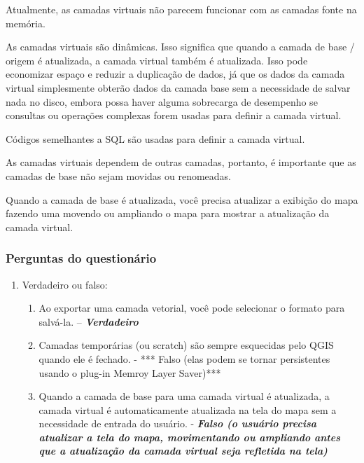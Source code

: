 \documentclass[
]{book}
\providecommand{\tightlist}{%
  \setlength{\itemsep}{0pt}\setlength{\parskip}{0pt}}
\begin{document}
Atualmente, as camadas virtuais não parecem funcionar com as camadas fonte na memória.

As camadas virtuais são dinâmicas. Isso significa que quando a camada de base / origem é atualizada, a camada virtual também é atualizada. Isso pode economizar espaço e reduzir a duplicação de dados, já que os dados da camada virtual simplesmente obterão dados da camada base sem a necessidade de salvar nada no disco, embora possa haver alguma sobrecarga de desempenho se consultas ou operações complexas forem usadas para definir a camada virtual.

Códigos semelhantes a SQL são usadas para definir a camada virtual.

As camadas virtuais dependem de outras camadas, portanto, é importante que as camadas de base não sejam movidas ou renomeadas.

Quando a camada de base é atualizada, você precisa atualizar a exibição do mapa fazendo uma movendo ou ampliando o mapa para mostrar a atualização da camada virtual.

\hypertarget{perguntas-do-questionuxe1rio-7}{%
\subsubsection{\texorpdfstring{\textbf{Perguntas do questionário}}{Perguntas do questionário}}\label{perguntas-do-questionuxe1rio-7}}

\begin{enumerate}
\def\labelenumi{\arabic{enumi}.}
\item
  Verdadeiro ou falso:

  \begin{enumerate}
  \def\labelenumii{\arabic{enumii}.}
  \tightlist
  \item
    Ao exportar uma camada vetorial, você pode selecionar o formato para salvá-la. -- \textbf{\emph{Verdadeiro}}
  \item
    Camadas temporárias (ou scratch) são sempre esquecidas pelo QGIS quando ele é fechado. - *** Falso (elas podem se tornar persistentes usando o plug-in Memroy Layer Saver)***
  \item
    Quando a camada de base para uma camada virtual é atualizada, a camada virtual é automaticamente atualizada na tela do mapa sem a necessidade de entrada do usuário. - \textbf{\emph{Falso (o usuário precisa atualizar a tela do mapa, movimentando ou ampliando antes que a atualização da camada virtual seja refletida na tela)}}
  \end{enumerate}
\end{enumerate}
\end{document}
